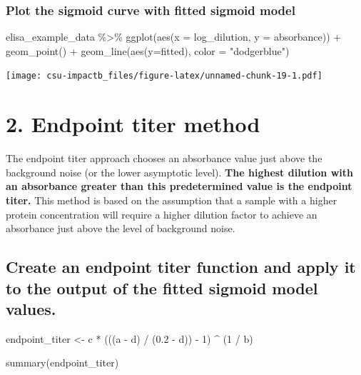 \documentclass[
]{book}
\newenvironment{Shaded}{\begin{snugshade}}{\end{snugshade}}
\newcommand{\AttributeTok}[1]{\textcolor[rgb]{0.77,0.63,0.00}{#1}}
\newcommand{\DecValTok}[1]{\textcolor[rgb]{0.00,0.00,0.81}{#1}}
\newcommand{\FloatTok}[1]{\textcolor[rgb]{0.00,0.00,0.81}{#1}}
\newcommand{\FunctionTok}[1]{\textcolor[rgb]{0.00,0.00,0.00}{#1}}
\newcommand{\NormalTok}[1]{#1}
\newcommand{\OtherTok}[1]{\textcolor[rgb]{0.56,0.35,0.01}{#1}}
\newcommand{\SpecialCharTok}[1]{\textcolor[rgb]{0.00,0.00,0.00}{#1}}
\newcommand{\StringTok}[1]{\textcolor[rgb]{0.31,0.60,0.02}{#1}}
\begin{document}
\hypertarget{plot-the-sigmoid-curve-with-fitted-sigmoid-model}{%
\subsubsection{Plot the sigmoid curve with fitted sigmoid model}\label{plot-the-sigmoid-curve-with-fitted-sigmoid-model}}

\begin{Shaded}
\begin{Highlighting}[]
\NormalTok{elisa\_example\_data }\SpecialCharTok{\%\textgreater{}\%}
  \FunctionTok{ggplot}\NormalTok{(}\FunctionTok{aes}\NormalTok{(}\AttributeTok{x =}\NormalTok{ log\_dilution, }\AttributeTok{y =}\NormalTok{ absorbance)) }\SpecialCharTok{+}
  \FunctionTok{geom\_point}\NormalTok{() }\SpecialCharTok{+}
  \FunctionTok{geom\_line}\NormalTok{(}\FunctionTok{aes}\NormalTok{(}\AttributeTok{y=}\NormalTok{fitted), }\AttributeTok{color =} \StringTok{"dodgerblue"}\NormalTok{)}
\end{Highlighting}
\end{Shaded}

\texttt{[image: csu-impactb\_files/figure-latex/unnamed-chunk-19-1.pdf]}

\hypertarget{endpoint-titer-method}{%
\section{2. Endpoint titer method}\label{endpoint-titer-method}}

The endpoint titer approach chooses an absorbance value just above the background noise (or the lower asymptotic level). \textbf{The highest dilution with an absorbance greater than this predetermined value is the endpoint titer.} This method is based on the assumption that a sample with a higher protein concentration will require a higher dilution factor to achieve an absorbance just above the level of background noise.

\hypertarget{create-an-endpoint-titer-function-and-apply-it-to-the-output-of-the-fitted-sigmoid-model-values.}{%
\subsection{Create an endpoint titer function and apply it to the output of the fitted sigmoid model values.}\label{create-an-endpoint-titer-function-and-apply-it-to-the-output-of-the-fitted-sigmoid-model-values.}}

\begin{Shaded}
\begin{Highlighting}[]
\NormalTok{endpoint\_titer }\OtherTok{\textless{}{-}}\NormalTok{ c }\SpecialCharTok{*}\NormalTok{ (((a }\SpecialCharTok{{-}}\NormalTok{ d) }\SpecialCharTok{/}\NormalTok{ (}\FloatTok{0.2} \SpecialCharTok{{-}}\NormalTok{ d)) }\SpecialCharTok{{-}} \DecValTok{1}\NormalTok{) }\SpecialCharTok{\^{}}\NormalTok{ (}\DecValTok{1} \SpecialCharTok{/}\NormalTok{ b)}

\FunctionTok{summary}\NormalTok{(endpoint\_titer)}
\end{Highlighting}
\end{Shaded}
\end{document}
